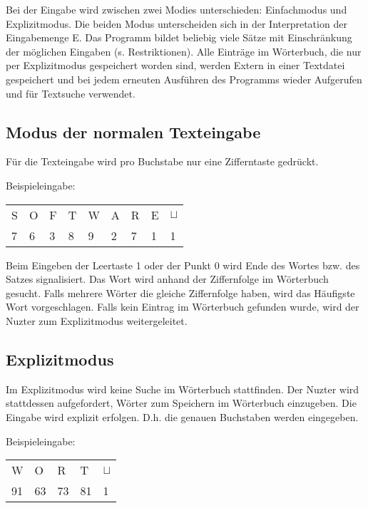 Bei der Eingabe wird zwischen zwei Modies unterschieden: Einfachmodus und Explizitmodus. Die beiden Modus unterscheiden sich in der Interpretation der Eingabemenge E.
Das Programm bildet beliebig viele Sätze mit Einschränkung der möglichen Eingaben (s. Restriktionen).
Alle Einträge im Wörterbuch, die nur per Explizitmodus gespeichert worden sind, werden Extern in einer Textdatei gespeichert und bei jedem erneuten Ausführen des Programms wieder Aufgerufen und für Textsuche verwendet.

\subsection{Modus der normalen Texteingabe}
\label{normal}

Für die Texteingabe wird pro Buchstabe nur eine Zifferntaste gedrückt.

Beispieleingabe:
\begin{table}[h!]
\begin{tabular}{lllllllll}
S & O & F & T & W & A & R & E & $\sqcup$ \\
7 & 6 & 3 & 8 & 9 & 2 & 7 & 1 & 1
\end{tabular}
\end{table}
\newline
Beim Eingeben der Leertaste 1 oder der Punkt 0 wird Ende des Wortes bzw. des Satzes signalisiert.
Das Wort wird anhand der Ziffernfolge im Wörterbuch gesucht.
Falls mehrere Wörter die gleiche Ziffernfolge haben, wird das Häufigste Wort vorgeschlagen.
Falls kein Eintrag im Wörterbuch gefunden wurde, wird der Nuzter zum Explizitmodus weitergeleitet.

\subsection{Explizitmodus}
\label{explizit}

Im Explizitmodus wird keine Suche im Wörterbuch stattfinden. Der Nuzter wird stattdessen aufgefordert, Wörter zum Speichern im Wörterbuch einzugeben.
Die Eingabe wird explizit erfolgen. D.h. die genauen Buchstaben werden eingegeben.

Beispieleingabe:
\newline
\begin{table}[h!]
\begin{tabular}{lllll}
W  & O  & R  & T  & $\sqcup$ \\
91 & 63 & 73 & 81 & 1       
\end{tabular}
\end{table}

